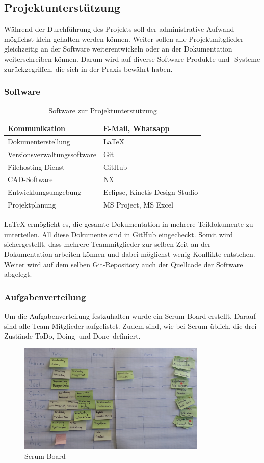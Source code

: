 \subsection{Projektunterstützung}
Während der Durchführung des Projekts soll der administrative Aufwand möglichst klein gehalten werden können. Weiter sollen alle Projektmitglieder gleichzeitig an der Software weiterentwickeln oder an der Dokumentation weiterschreiben können. Darum wird auf diverse Software-Produkte und -Systeme zurückgegriffen, die sich in der Praxis bewährt haben.
%
\subsubsection{Software}
\begin{table}[H]
\begin{tabular}{|p{}|p{}|}\hline
%	
Kommunikation	&	E-Mail, Whatsapp \\\hline
Dokumenterstellung & LaTeX\\\hline
Versionsverwaltungssoftware & Git \\\hline
Filehosting-Dienst & GitHub \\\hline
CAD-Software & NX\\\hline
Entwicklungsumgebung	& Eclipse, Kinetis Design Studio \\\hline
Projektplanung & MS Project, MS Excel \\\hline
\end{tabular}
\caption{Software zur Projektunterstützung}
\end{table}
LaTeX ermöglicht es, die gesamte Dokumentation in mehrere Teildokumente zu unterteilen. All diese Dokumente sind in GitHub eingecheckt. Somit wird sichergestellt, dass mehrere Teammitglieder zur selben Zeit an der Dokumentation arbeiten können und dabei möglichst wenig Konflikte entstehen. Weiter wird auf dem selben Git-Repository auch der Quellcode der Software abgelegt.
\subsubsection{Aufgabenverteilung}
Um die Aufgabenverteilung festzuhalten wurde ein Scrum-Board erstellt. Darauf sind alle Team-Mitglieder aufgelistet. Zudem sind, wie bei Scrum üblich, die drei Zustände \glqq ToDo\grqq, \glqq Doing\grqq \ und \glqq Done\grqq \ definiert.
\begin{figure}[H]%
\centering
\includegraphics[width=0.8\textwidth]{04_Projektmanagement/fig/scrumBoard.jpg}
\caption{Scrum-Board}
\label{fig:scrumBoard}
\end{figure}